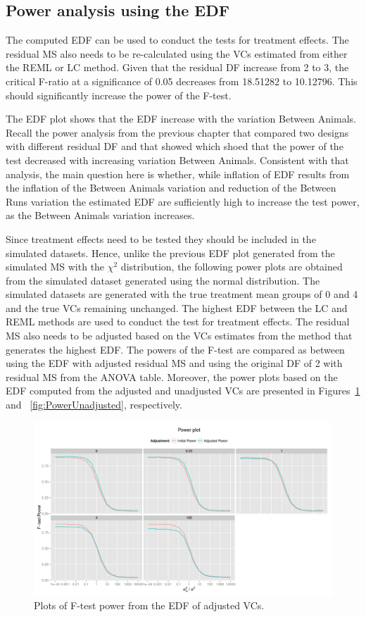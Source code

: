 \documentclass[12pt,a4paper]{article}
\begin{document}
\subsection{Power analysis using the EDF}
The computed EDF can be used to conduct the tests for treatment effects. The residual MS also needs to be re-calculated using the VCs estimated from either the REML or LC method. Given that the residual DF increase from 2 to 3, the critical F-ratio at a significance of 0.05 decreases from 18.51282 to 10.12796. This should significantly increase the power of the F-test.  

The EDF plot shows that the EDF increase with the variation Between Animals. Recall the power analysis from the previous chapter that compared two designs with different residual DF and that showed which shoed that the power of the test decreased with increasing variation Between Animals. Consistent with that analysis, the main question here is whether, while inflation of EDF results from the inflation of the Between Animals variation and reduction of the Between Runs variation the estimated EDF are sufficiently high to increase the test power, as the Between Animals variation increases. 

Since treatment effects need to be tested they should be included in the simulated datasets. Hence, unlike the previous EDF plot generated from the simulated MS with the $\chi^2$ distribution, the following power plots are obtained from the simulated dataset generated using the normal distribution. The simulated datasets are generated with the true treatment mean groups of 0 and 4 and the true VCs remaining unchanged. The highest EDF between the LC and REML methods are used to conduct the test for treatment effects. The residual MS also needs to be adjusted based on the VCs estimates from the method that generates the highest EDF. The powers of the F-test are compared as between using the EDF with adjusted residual MS and using the original DF of 2 with residual MS from the ANOVA table. Moreover, the power plots based on the EDF computed from the adjusted and unadjusted VCs are presented in Figures~\ref{fig:PowerAdjusted} and ~\ref{fig:PowerUnadjusted}, respectively.

\begin{figure}[ht]
\centering
\includegraphics[width=1 \textwidth]{Graph/adjustZeroPowerEDF.pdf}
\caption{Plots of F-test power from the EDF of adjusted VCs.}
\label{fig:PowerAdjusted}
\end{figure}
\end{document}
